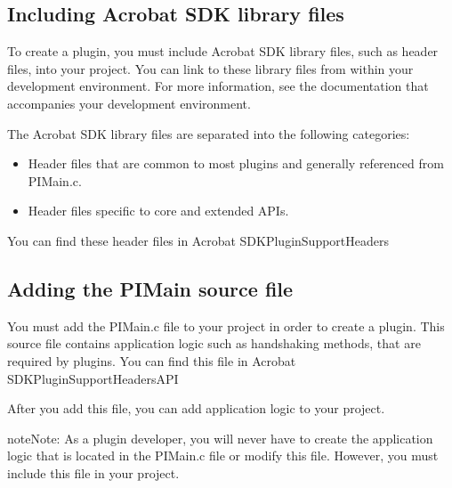 \documentclass[letterpaper,12pt,english,openany,oneside]{sphinxmanual}
\begin{document}
\subsection{Including Acrobat SDK library files}
\label{\detokenize{Plugins_CreatingSimplePlug:including-acrobat-sdk-library-files}}
To create a plugin, you must include Acrobat SDK library files, such as header files, into your project. You can link to these library files from within your development environment. For more information, see the documentation that accompanies your development environment.

The Acrobat SDK library files are separated into the following categories:
\begin{itemize}
\item {} 
Header files that are common to most plugins and generally referenced from PIMain.c.

\item {} 
Header files specific to core and extended APIs.

\end{itemize}

You can find these header files in  Acrobat SDKPluginSupportHeaders


\subsection{Adding the PIMain source file}
\label{\detokenize{Plugins_CreatingSimplePlug:adding-the-pimain-source-file}}
You must add the PIMain.c file to your project in order to create a plugin. This source file contains application logic such as handshaking methods, that are required by plugins. You can find this file in Acrobat SDKPluginSupportHeadersAPI

After you add this file, you can add application logic to your project.

\begin{sphinxadmonition}{note}{Note:}
As a plugin developer, you will never have to create the application logic that is located in the PIMain.c file or modify this file. However, you must include this file in your project.
\end{sphinxadmonition}
\end{document}
